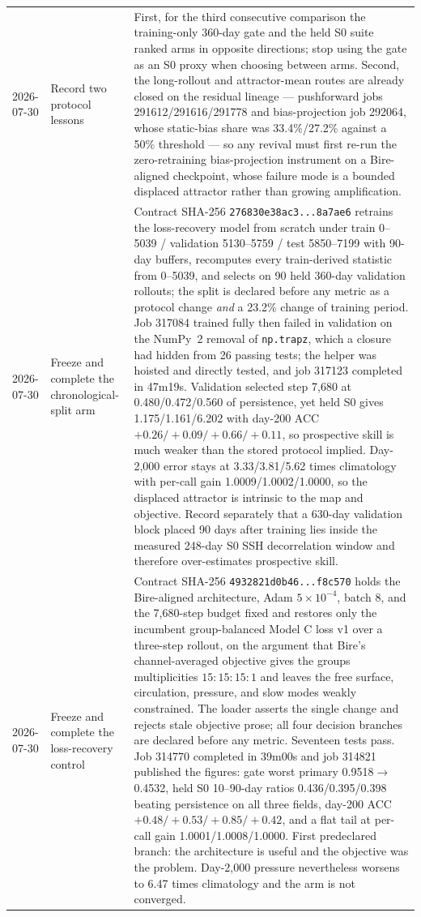 \documentclass[11pt]{article}
\begin{document}
\begin{longtable}{@{}p{}p{}p{}@{}}
2026-07-30 & Record two protocol lessons & First, for the third consecutive comparison the training-only 360-day gate and the held S0 suite ranked arms in opposite directions; stop using the gate as an S0 proxy when choosing between arms.  Second, the long-rollout and attractor-mean routes are already closed on the residual lineage --- pushforward jobs 291612/291616/291778 and bias-projection job 292064, whose static-bias share was 33.4\%/27.2\% against a 50\% threshold --- so any revival must first re-run the zero-retraining bias-projection instrument on a Bire-aligned checkpoint, whose failure mode is a bounded displaced attractor rather than growing amplification. \\
2026-07-30 & Freeze and complete the chronological-split arm & Contract SHA-256 \texttt{276830e38ac3...8a7ae6} retrains the loss-recovery model from scratch under train 0--5039 / validation 5130--5759 / test 5850--7199 with 90-day buffers, recomputes every train-derived statistic from 0--5039, and selects on 90 held 360-day validation rollouts; the split is declared before any metric as a protocol change \emph{and} a 23.2\% change of training period.  Job 317084 trained fully then failed in validation on the NumPy~2 removal of \texttt{np.trapz}, which a closure had hidden from 26 passing tests; the helper was hoisted and directly tested, and job 317123 completed in 47m19s.  Validation selected step 7,680 at 0.480/0.472/0.560 of persistence, yet held S0 gives 1.175/1.161/6.202 with day-200 ACC \(+0.26/+0.09/+0.66/+0.11\), so prospective skill is much weaker than the stored protocol implied.  Day-2,000 error stays at 3.33/3.81/5.62 times climatology with per-call gain 1.0009/1.0002/1.0000, so the displaced attractor is intrinsic to the map and objective.  Record separately that a 630-day validation block placed 90 days after training lies inside the measured 248-day S0 SSH decorrelation window and therefore over-estimates prospective skill. \\
2026-07-30 & Freeze and complete the loss-recovery control & Contract SHA-256 \texttt{4932821d0b46...f8c570} holds the Bire-aligned architecture, Adam \(5\times10^{-4}\), batch 8, and the 7,680-step budget fixed and restores only the incumbent group-balanced Model C loss v1 over a three-step rollout, on the argument that Bire's channel-averaged objective gives the groups multiplicities \(15{:}15{:}15{:}1\) and leaves the free surface, circulation, pressure, and slow modes weakly constrained.  The loader asserts the single change and rejects stale objective prose; all four decision branches are declared before any metric.  Seventeen tests pass.  Job 314770 completed in 39m00s and job 314821 published the figures: gate worst primary 0.9518\(\rightarrow\)0.4532, held S0 10--90-day ratios 0.436/0.395/0.398 beating persistence on all three fields, day-200 ACC \(+0.48/+0.53/+0.85/+0.42\), and a flat tail at per-call gain 1.0001/1.0008/1.0000.  First predeclared branch: the architecture is useful and the objective was the problem.  Day-2,000 pressure nevertheless worsens to 6.47 times climatology and the arm is not converged. \\

\end{longtable}
\end{document}
